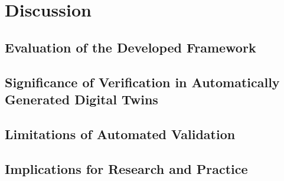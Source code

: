 \chapter{Discussion}
\label{chap:discussion}

\section{Evaluation of the Developed Framework}

\section{Significance of Verification in Automatically Generated Digital Twins}

\section{Limitations of Automated Validation}

\section{Implications for Research and Practice}
